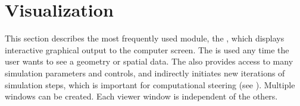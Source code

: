 \newcommand{\framewidget}{%
  \centerline{\includegraphics[bb=0 0 328 268,height=2in]
    {Figures/widget-frame.eps.gz}}
}
\begin{htmlonly}
  \newcommand{\framewidget}{%
  \htmladdimg[alt="framewidget"]{../Figures/widget-frame.gif}}
\end{htmlonly}

\newcommand{\boxwidget}{%
  \centerline{\includegraphics[bb=0 0 458 342,height=2in]
    {Figures/widget-box.eps.gz}}
}
\begin{htmlonly}
  \newcommand{\boxwidget}{%
    \htmladdimg[alt="boxwidget"]{../Figures/widget-box.gif}
  }
\end{htmlonly}

\newcommand{\ringwidget}{%
  \centerline{\includegraphics[bb=0 0 507 467,height=2in]
  {Figures/widget-ring.eps.gz}}
}
\begin{htmlonly}
  \newcommand{\ringwidget}{%
    \htmladdimg[alt="ringwidget"] {../Figures/widget-ring.gif}
  }
\end{htmlonly}

\newcommand{\recordmoviewin}{%
  \centerline{\includegraphics[bb=0 0 176 183]
    {Figures/record_movie_win.eps.gz}}
}
\begin{htmlonly}
  \newcommand{\recordmoviewin}{%
  \htmladdimg[alt="Movie Recording
  Dialog"]{../Figures/record_movie_win.gif}
}
\end{htmlonly}

\newcommand{\graphics}{\emph{Graphics}}

\chapter{Visualization}
\label{ch:viewer}

This section describes the most frequently used \sr{} module,
the \viewer{}, which displays interactive graphical
output to the computer screen.  The \viewer{} is used any time the user
wants to see a geometry or spatial data. The \viewer{} also provides access to
many simulation parameters and controls, and indirectly initiates new
iterations of  simulation steps, which is important for computational
steering (see ).
Multiple \viewer{} windows can be created.  Each viewer window is
independent of the others.

